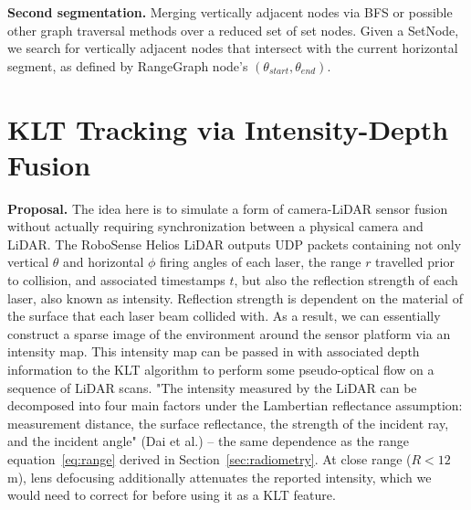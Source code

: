 \documentclass[11pt]{article}
\begin{document}
\textbf{Second segmentation.} Merging vertically adjacent nodes via BFS or possible other graph traversal methods over a reduced set of set nodes. Given a SetNode,
we search for vertically adjacent nodes that intersect with the current horizontal segment, as defined by RangeGraph node's $(\theta_{start}, \theta_{end})$.

\section{KLT Tracking via Intensity-Depth Fusion}
\textbf{Proposal.} The idea here is to simulate a form of camera-LiDAR sensor fusion without actually requiring synchronization between a physical camera and LiDAR.
The RoboSense Helios LiDAR outputs UDP packets containing not only vertical $\theta$ and horizontal $\phi$ firing angles of each laser, the range $r$ travelled 
prior to collision, and associated timestamps $t$, but also the reflection strength of each laser, also known as intensity. Reflection strength is dependent on the
material of the surface that each laser beam collided with. As a result, we can essentially construct a sparse image of the environment around the sensor platform
via an intensity map. This intensity map can be passed in with associated depth information to the KLT algorithm to perform some pseudo-optical flow on a sequence 
of LiDAR scans.
"The intensity measured by the LiDAR can be decomposed into four main factors under the Lambertian reflectance assumption: measurement  distance, the surface reflectance,
the strength of the incident ray, and the incident angle" (Dai et al.) -- the same dependence as the range equation~\eqref{eq:range} derived in Section~\ref{sec:radiometry}.
At close range ($R < 12$\,m), lens defocusing additionally attenuates the reported intensity, which we would need to correct for before using it as a KLT feature.
\end{document}
